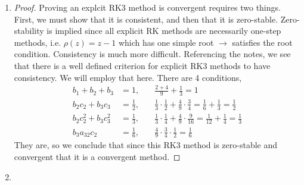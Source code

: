 \documentclass{article}
\begin{document}
\begin{enumerate}[label=\alph*)]
 
 \item

 \begin{proof}
    Proving an explcit RK3 method is convergent requires two things. First, we
    must show that it is consistent, and then that it is zero-stable.
    Zero-stability is implied since all explicit RK methods are necessarily
    one-step methods, i.e. $\rho(z) = z - 1$ which has one simple root $\to$
    satisfies the root condition. Consistency is much more difficult.
    Referencing the notes, we see that there is a well defined criterion for
    explicit RK3 methods to have consistency. We will employ that here. There
    are 4 conditions, 
    \begin{align*}
        b_1 + b_2 + b_3 &= 1, \quad 
        &\frac{2 + 4}{9} + \frac{1}{3} = 1\\
        b_2c_2 + b_3c_3 &= \frac{1}{2}, \quad 
        &\frac{1}{3}\cdot\frac{1}{2} + \frac{4}{9}\cdot\frac{3}{4} = \frac{1}{6} +
        \frac{1}{3} = \frac{1}{2}\\
        b_2c_2^2 + b_3c_3^2 &= \frac{1}{3}, \quad
        &\frac{1}{3}\cdot\frac{1}{4} + \frac{4}{9}\cdot\frac{9}{16} = \frac{1}{12} +
        \frac{1}{4} = \frac{1}{3}\\
        b_3a_{32}c_2 &= \frac{1}{6}, \quad 
        &\frac{4}{9}\cdot\frac{3}{4}\cdot\frac{1}{2} = \frac{1}{6}
    \end{align*}
    They are, so we conclude that since this RK3 method is zero-stable and
    convergent that it is a convergent method. 
 \end{proof}

 \item


\end{enumerate}
\end{document}
